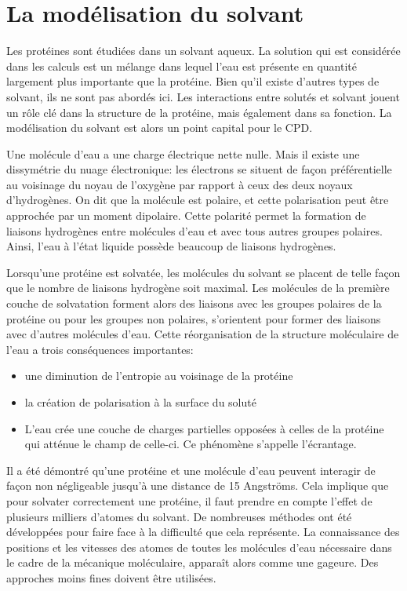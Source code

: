 \section{La modélisation du solvant}
Les protéines sont étudiées dans un solvant aqueux. La solution qui est considérée dans les calculs est un mélange dans lequel l'eau est présente en quantité largement plus importante que la protéine. Bien qu'il existe d'autres types de solvant, ils ne sont pas abordés ici. Les interactions entre solutés et solvant jouent un rôle clé dans la structure de la protéine, mais également dans sa fonction. La modélisation du solvant est alors un point capital pour le CPD.

Une molécule d'eau a une charge électrique nette nulle. Mais il existe une dissymétrie du nuage électronique: les électrons se situent de façon préférentielle au voisinage du noyau de l'oxygène par rapport à ceux des deux noyaux d'hydrogènes. On dit que la molécule est polaire, et cette polarisation peut être approchée par un moment dipolaire. Cette polarité permet la formation de liaisons hydrogènes entre molécules d'eau et avec tous autres groupes polaires. Ainsi, l'eau à l'état liquide possède beaucoup de liaisons hydrogènes.

Lorsqu'une protéine est solvatée, les molécules du solvant se placent de telle façon que le nombre de liaisons hydrogène soit maximal. Les molécules de la première couche de solvatation forment alors des liaisons avec les groupes polaires de la protéine ou pour les groupes non polaires, s'orientent pour former des liaisons avec d'autres molécules d'eau. Cette réorganisation de la structure moléculaire de l'eau a trois conséquences importantes:

\begin{itemize}
\item une diminution de l'entropie au voisinage de la protéine  
\item la création de polarisation à la surface du soluté
\item  L'eau crée une couche de charges partielles opposées à celles de la protéine qui atténue le champ de celle-ci. Ce phénomène s'appelle l'écrantage.
\end{itemize}
  
Il a été démontré qu'une protéine et une molécule d'eau peuvent interagir de façon non négligeable jusqu'à une distance de 15 Angströms. Cela implique que pour solvater correctement une protéine, il faut prendre en compte l'effet de plusieurs milliers d'atomes du solvant.
De nombreuses méthodes ont été développées pour faire face à la difficulté que cela représente.
La connaissance des positions et les vitesses des atomes de toutes les molécules d'eau nécessaire dans le cadre de la mécanique moléculaire, apparaît alors comme une gageure. Des approches moins fines doivent être utilisées. 

